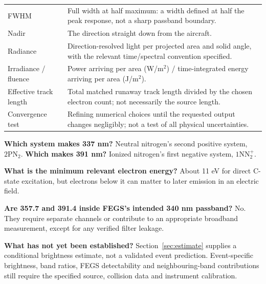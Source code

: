 \documentclass[11pt,a4paper]{article}
\newcommand{\TwoP}{\ensuremath{2\mathrm{P}\mathrm{N}_2}}
\newcommand{\OneN}{\ensuremath{1\mathrm{N}\mathrm{N}_2^{+}}}
\begin{document}
\begin{center}
\begin{tabularx}{\textwidth}{@{}P{38mm}Y@{}}
FWHM & Full width at half maximum: a width defined at half the peak response, not a sharp passband boundary.\\
Nadir & The direction straight down from the aircraft.\\
Radiance & Direction-resolved light per projected area and solid angle, with the relevant time/spectral convention specified.\\
Irradiance / fluence & Power arriving per area (W/m$^2$) / time-integrated energy arriving per area (J/m$^2$).\\
Effective track length & Total matched runaway track length divided by the chosen electron count; not necessarily the source length.\\
Convergence test & Refining numerical choices until the requested output changes negligibly; not a test of all physical uncertainties.\\
\bottomrule
\end{tabularx}
\end{center}

\textbf{Which system makes 337 nm?} Neutral nitrogen's second positive system, \TwoP.\quad
\textbf{Which makes 391 nm?} Ionized nitrogen's first negative system, \OneN.

\textbf{What is the minimum relevant electron energy?} About 11 eV for direct C-state excitation, but electrons below it can matter to later emission in an electric field.

\textbf{Are 357.7 and 391.4 inside FEGS's intended 340 nm passband?} No. They require separate channels or contribute to an appropriate broadband measurement, except for any verified filter leakage.

\textbf{What has not yet been established?} Section~\ref{sec:estimate} supplies a conditional brightness estimate, not a validated event prediction. Event-specific brightness, band ratios, FEGS detectability and neighbouring-band contributions still require the specified source, collision data and instrument calibration.

\clearpage
{}
\end{document}
